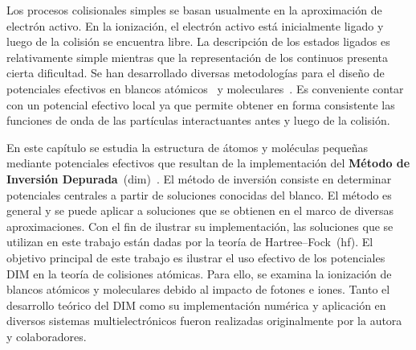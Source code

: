 Los procesos colisionales simples se basan usualmente en la 
aproximación de electrón activo. En la ionización, el electrón activo 
está inicialmente ligado y luego de la colisión se encuentra libre. La 
descripción de los estados ligados es relativamente simple mientras que 
la representación de los continuos presenta cierta dificultad. Se han 
desarrollado diversas metodologías para el diseño de potenciales 
efectivos en blancos atómicos~\cite{Hibbert:82,Gombas:56,Green:69,
Klapisch:71,Phillips:59,Herman:63,Dalgarno:70,Bayliss:77,Cowan:76,
Lee:77} y moleculares~\cite{Menchero:10,Granados:16}. Es conveniente 
contar con un potencial efectivo local ya que permite obtener en forma 
consistente las funciones de onda de las partículas interactuantes antes
y luego de la colisión.

En este capítulo se estudia la estructura de átomos y moléculas pequeñas 
mediante potenciales efectivos que resultan de la implementación del 
\textbf{Método de Inversión Depurada}~(\acs{dim})~\cite{Mendez:16,
Mendez:18,Mendez:19dim}. El método de inversión consiste en determinar 
potenciales centrales a partir de soluciones conocidas del blanco. 
El método es general y se puede aplicar a soluciones que se obtienen en 
el marco de diversas aproximaciones. Con el fin de ilustrar su 
implementación, las soluciones que se utilizan en este trabajo están 
dadas por la teoría de Hartree--Fock~(\acs{hf}). 
El objetivo principal de este trabajo es ilustrar el uso efectivo de los
potenciales DIM en la teoría de colisiones atómicas. Para ello, se 
examina la ionización de blancos atómicos y moleculares debido al 
impacto de fotones e iones. Tanto el desarrollo teórico del DIM como su 
implementación numérica y aplicación en diversos sistemas 
multielectrónicos fueron 
realizadas originalmente por la autora y colaboradores. 

